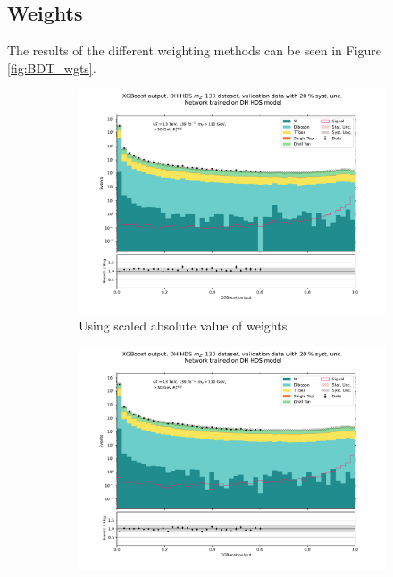 \documentclass[12pt, a4paper]{book}
\begin{document}
\subsection{Weights}
The results of the different weighting methods can be seen in Figure \ref{fig:BDT_wgts}.\\
\graphicspath{{../../../Plots/XGBoost/Weighting_methods/}}
\begin{figure}[!ht]
	\centering
	\begin{subfigure}[b]{0.49\textwidth}
      \centering
      \includegraphics[width=1\textwidth]{Abs_wgt/VAL.pdf}
      \caption{Using scaled absolute value of weights}
   \end{subfigure}
   \begin{subfigure}[b]{0.49\textwidth}
      \centering
      \includegraphics[width=1\textwidth]{Pos_wgt/VAL.pdf}

\end{subfigure}
\end{figure}
\end{document}
